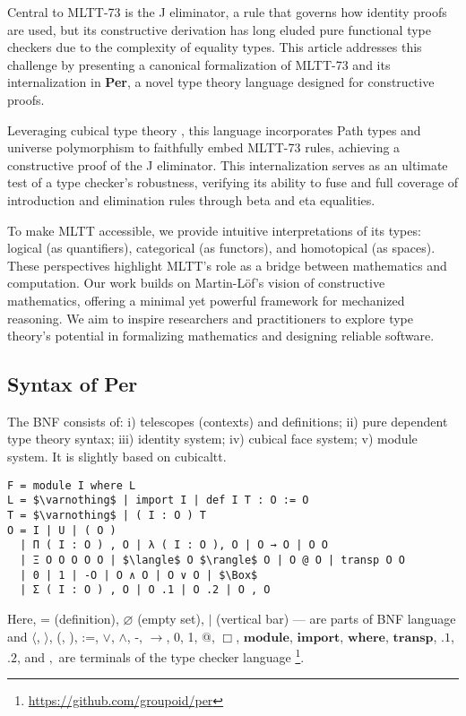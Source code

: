 \documentclass{article}
\begin{document}
Central to MLTT-73 is the J eliminator, a rule that governs how identity proofs
are used, but its constructive derivation has long eluded pure
functional type checkers due to the complexity of equality types.
This article addresses this challenge by presenting a canonical
formalization of MLTT-73 and its internalization in \textbf{Per},
a novel type theory language designed for constructive proofs.

Leveraging cubical type theory \cite{Mortberg17}, this language
incorporates Path types and universe polymorphism to faithfully
embed MLTT-73 rules, achieving a constructive proof of the J eliminator.
This internalization serves as an ultimate test of a type checker’s robustness,
verifying its ability to fuse and full coverage of
introduction and elimination rules through beta and eta equalities.

To make MLTT accessible, we provide intuitive interpretations
of its types: logical (as quantifiers), categorical (as functors),
and homotopical (as spaces). These perspectives highlight MLTT’s role
as a bridge between mathematics and computation. Our work builds on
Martin-Löf’s vision of constructive mathematics, offering a minimal
yet powerful framework for mechanized reasoning. We aim to inspire
researchers and practitioners to explore type theory’s potential in
formalizing mathematics and designing reliable software.

\subsection*{Syntax of Per}
The BNF consists of:
i) telescopes (contexts) and definitions;
ii) pure dependent type theory syntax;
iii) identity system;
iv) cubical face system;
v) module system. It is slightly based on cubicaltt.

\begin{lstlisting}[mathescape=true]
F = module I where L
L = $\varnothing$ | import I | def I T : O := O
T = $\varnothing$ | ( I : O ) T
O = I | U | ( O )
  | Π ( I : O ) , O | λ ( I : O ), O | O → O | O O
  | Ξ O O O O O | $\langle$ O $\rangle$ O | O @ O | transp O O
  | 0 | 1 | -O | O ∧ O | O ∨ O | $\Box$
  | Σ ( I : O ) , O | O .1 | O .2 | O , O
\end{lstlisting}

Here, = (definition), $\varnothing$ (empty set), $\rvert$ (vertical bar) --- are parts of BNF language and
$\langle$, $\rangle$, (, ), :=, $\vee$, $\wedge$, -, $\rightarrow$, 0, 1, @, $\Box$,
$\mathbf{module}$, $\mathbf{import}$, $\mathbf{where}$, $\mathbf{transp}$, $\mathbf{.1}$, $\mathbf{.2}$,
and $,$ are terminals of the type checker language \footnote{\url{https://github.com/groupoid/per}}.
\end{document}
